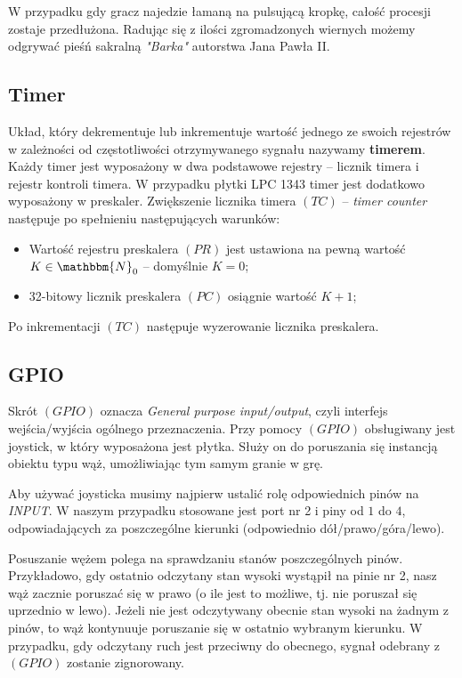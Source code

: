 \documentclass[a4paper,12pt,twoside]{article}
\newcommand{\N}{\mathbbm{N}}
\theoremstyle{plain}
\theoremstyle{definition}
\theoremstyle{remark}
\begin{document}
W przypadku gdy gracz najedzie łamaną na pulsującą kropkę, całość procesji zostaje przedłużona. Radując się z ilości zgromadzonych wiernych możemy odgrywać pieśń sakralną \textit{"Barka"} autorstwa Jana Pawła II.



\subsection{Timer}
Układ, który dekrementuje lub inkrementuje wartość jednego ze swoich rejestrów w zależności od częstotliwości otrzymywanego sygnału nazywamy \textbf{timerem}. Każdy timer jest wyposażony w dwa podstawowe rejestry -- licznik timera i rejestr kontroli timera. W przypadku płytki LPC 1343 timer jest dodatkowo wyposażony w preskaler. Zwiększenie licznika timera $(TC)$ -- \textit{timer counter} następuje po spełnieniu następujących warunków:
\begin{itemize}
\item Wartość rejestru preskalera $(PR)$ jest ustawiona na pewną wartość $K\in \N_0$ -- domyślnie $K=0$;
\item 32-bitowy licznik preskalera $(PC)$ osiągnie wartość $K+1$;
\end{itemize}
Po inkrementacji $(TC)$ następuje wyzerowanie licznika preskalera.
\subsection{GPIO}
Skrót $(GPIO)$ oznacza \textit{General purpose input/output}, czyli interfejs wejścia/wyjścia ogólnego przeznaczenia. Przy pomocy $(GPIO)$ obsługiwany jest joystick, w który wyposażona jest płytka. Służy on do poruszania się instancją obiektu typu wąż, umożliwiając tym samym granie w grę.

Aby używać joysticka musimy najpierw ustalić rolę odpowiednich pinów na \textit{INPUT}. W naszym przypadku stosowane jest port nr 2 i piny od $1$ do $4$, odpowiadających za poszczególne kierunki (odpowiednio dół/prawo/góra/lewo). 

Posuszanie wężem polega na sprawdzaniu stanów poszczególnych pinów. Przykładowo, gdy ostatnio odczytany stan wysoki wystąpił na pinie nr 2, nasz wąż zacznie poruszać się w prawo (o ile jest to możliwe, tj. nie poruszał się uprzednio w lewo). Jeżeli nie jest odczytywany obecnie stan wysoki na żadnym z pinów, to wąż kontynuuje poruszanie się w ostatnio wybranym kierunku. W przypadku, gdy odczytany ruch jest przeciwny do obecnego, sygnał odebrany z $(GPIO)$ zostanie zignorowany.
\end{document}
